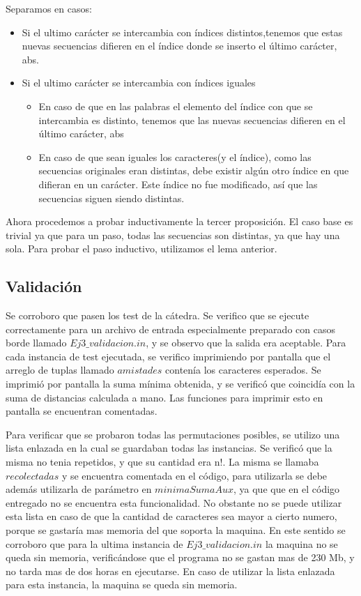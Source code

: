 Separamos en casos:

\begin{itemize}
\item Si el ultimo carácter se intercambia con índices distintos,tenemos que estas nuevas secuencias difieren en el índice donde se inserto el último carácter, abs.
\end{itemize}


\begin{itemize}
\item Si el ultimo carácter se intercambia con índices iguales
	\begin{itemize}
		\item En caso de que en las palabras el elemento del índice con que se intercambia es distinto, tenemos que las nuevas secuencias difieren en el último carácter, abs 
		\item En caso de que sean iguales los caracteres(y el índice), como las secuencias originales eran distintas, debe existir algún otro índice en que difieran en un carácter. Este índice no fue modificado, así que las secuencias siguen siendo distintas.
	\end{itemize}
\end{itemize}

Ahora procedemos a probar inductivamente la tercer proposición. El caso base es trivial ya que para un paso, todas las secuencias son distintas, ya que hay una sola. Para probar el paso inductivo, utilizamos el lema anterior.
\subsection{Validación}

Se corroboro que pasen los test de la cátedra. Se verifico que se ejecute correctamente para un archivo de entrada especialmente preparado con casos borde llamado $ Ej3\_validacion.in $, y se observo que la salida era aceptable. Para cada instancia de test ejecutada, se verifico imprimiendo por pantalla que el arreglo de tuplas llamado $ amistades $ contenía los caracteres esperados. Se imprimió por pantalla la suma mínima obtenida, y se verificó que coincidía con la suma de distancias calculada a mano. Las funciones para imprimir esto en pantalla se encuentran comentadas.

Para verificar que se probaron todas las permutaciones posibles, se utilizo una lista enlazada en la cual se guardaban todas las instancias. Se verificó que la misma no tenia repetidos, y que su cantidad era n!. La misma se llamaba $ recolectadas $ y se encuentra comentada en el código, para utilizarla se debe además utilizarla de parámetro en $minimaSumaAux$, ya que que en el código entregado no se encuentra esta funcionalidad. No obstante no se puede utilizar esta lista en caso de que la cantidad de caracteres sea mayor a cierto numero, porque se gastaría mas memoria del que soporta la maquina. En este sentido se corroboro que para la ultima instancia de $ Ej3\_validacion.in $ la maquina no se queda sin memoria, verificándose que el programa no se gastan mas de 230 Mb, y no tarda mas de dos horas en ejecutarse. En caso de utilizar la lista enlazada para esta instancia, la maquina se queda sin memoria.


